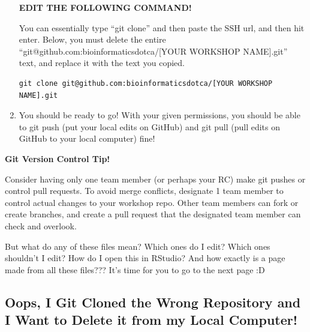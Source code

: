 \documentclass[
]{book}
\newenvironment{redbox}{
  \definecolor{shadecolor}{RGB}{243, 154, 157}
  \color{white}
  \begin{shaded}}
 {\end{shaded}}
\newenvironment{bluebox}{
  \definecolor{shadecolor}{RGB}{172, 210, 237}
  \color{white}
  \begin{shaded}}
 {\end{shaded}}
\theoremstyle{definition}
\theoremstyle{definition}
\theoremstyle{definition}
\theoremstyle{definition}
\theoremstyle{remark}
\begin{document}
\begin{enumerate}
  \begin{redbox}

  \begin{center}
  \textbf{EDIT THE FOLLOWING COMMAND!}

  \end{center}

  You can essentially type ``git clone'' and then paste the SSH url, and then hit enter. Below, you must delete the entire ``{git@}github.com:bioinformaticsdotca/{[}YOUR WORKSHOP NAME{]}.git'' text, and replace it with the text you copied.

  \end{redbox}

\begin{verbatim}
git clone git@github.com:bioinformaticsdotca/[YOUR WORKSHOP NAME].git
\end{verbatim}
\item
  You should be ready to go! With your given permissions, you should be able to git push (put your local edits on GitHub) and git pull (pull edits on GitHub to your local computer) fine!
\end{enumerate}

\begin{bluebox}

\begin{center}
\textbf{Git Version Control Tip!}

\end{center}

Consider having only one team member (or perhaps your RC) make git pushes or control pull requests. To avoid merge conflicts, designate 1 team member to control actual changes to your workshop repo. Other team members can fork or create branches, and create a pull request that the designated team member can check and overlook.

\end{bluebox}

But what do any of these files mean? Which ones do I edit? Which ones shouldn't I edit? How do I open this in RStudio? And how exactly is a page made from all these files??? It's time for you to go to the next page :D

\subsection{Oops, I Git Cloned the Wrong Repository and I Want to Delete it from my Local Computer!}\label{delete-git-folder-locally}
\end{document}
